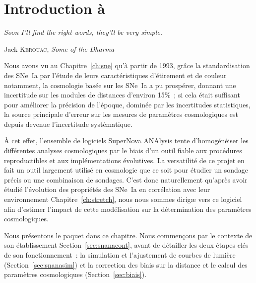 \documentclass[../main/main.tex]{subfiles}
\begin{document}

\chapter{Introduction \`a \snana}\label{ch:snana}
\epigraph{\openquote\textit{Soon I'll find the right words, they'll be very
simple.}\closequote}{Jack \textsc{Kerouac}, \textit{Some of the Dharma}}

Nous avons vu au Chapitre~\ref{ch:sne} qu'à partir de 1993, grâce la
standardisation des SNe~Ia par l'étude de leurs caractéristiques d'étirement et
de couleur notamment, la cosmologie basée sur les SNe~Ia a pu prospérer, donnant
une incertitude sur les modules de distances d'environ 15\%~; si cela était
suffisant pour améliorer la précision de l'époque, dominée par les incertitudes
statistiques, la source principale d'erreur sur les mesures de paramètres
cosmologiques est depuis devenue l'incertitude systématique.

À cet effet, l'ensemble de logiciels SuperNova ANAlysis
\citep[\snana,][]{kessler2009a} tente d'homogénéiser les différentes analyses
cosmologiques par le biais d'un outil fiable aux procédures reproductibles et
aux implémentations évolutives. La versatilité de ce projet en fait un outil
largement utilisé en cosmologie \citep[par exemple,][]{kessler2009b, conley2011,
betoule2014, smith2020} que ce soit pour étudier un sondage précis ou une
combinaison de sondages. C'est donc naturellement qu'après avoir étudié
l'évolution des propriétés des SNe~Ia en corrélation avec leur environnement
Chapitre~\ref{ch:stretch}, nous nous sommes dirigæ vers ce logiciel afin
d'estimer l'impact de cette modélisation sur la détermination des paramètres
cosmologiques.

Nous présentons le paquet dans ce chapitre. Nous commençons par le contexte de
son établissement Section~\ref{sec:snanacont}, avant de détailler les deux
étapes clés de son fonctionnement~: la simulation et l'ajustement de courbes de
lumière (Section~\ref{sec:snanasim}) et la correction des biais sur la distance
et le calcul des paramètres cosmologiques (Section~\ref{sec:biais}).

\vfill
\minitoc
\vfill

\clearpage

\thispagestyle{plain}
\vspace*{\fill}
\minilof
\vspace*{\fill}
\minilot
\vspace*{\fill}
\end{document}
